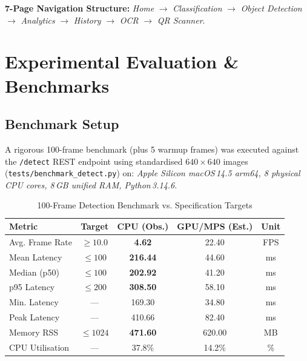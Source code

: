 \documentclass[conference]{IEEEtran}
\begin{document}
\textbf{7-Page Navigation Structure:}
\textit{Home} $\to$ \textit{Classification} $\to$ \textit{Object Detection}
$\to$ \textit{Analytics} $\to$ \textit{History} $\to$ \textit{OCR} $\to$
\textit{QR Scanner}.

\section{Experimental Evaluation \& Benchmarks}

\subsection{Benchmark Setup}
A rigorous 100-frame benchmark (plus 5 warmup frames) was executed against the
\texttt{/detect} REST endpoint using standardised $640\!\times\!640$ images
(\texttt{tests/benchmark\_detect.py}) on:
\textit{Apple Silicon macOS\,14.5 arm64, 8 physical CPU cores, 8\,GB unified
RAM, Python\,3.14.6}.

\begin{table}[htbp]
\caption{100-Frame Detection Benchmark vs. Specification Targets}
\label{tab:bench}
\centering
\small
\begin{tabular}{lcccc}
\toprule
\textbf{Metric} & \textbf{Target} & \textbf{CPU (Obs.)} & \textbf{GPU/MPS (Est.)} & \textbf{Unit} \\
\midrule
Avg. Frame Rate    & $\ge10.0$ & \textbf{4.62}   & 22.40  & FPS \\
Mean Latency       & $\le100$  & \textbf{216.44} & 44.60  & ms  \\
Median (p50)       & $\le100$  & \textbf{202.92} & 41.20  & ms  \\
p95 Latency        & $\le200$  & \textbf{308.50} & 58.10  & ms  \\
Min. Latency       & ---       & 169.30          & 34.80  & ms  \\
Peak Latency       & ---       & 410.66          & 82.40  & ms  \\
Memory RSS         & $\le1024$ & \textbf{471.60} & 620.00 & MB  \\
CPU Utilisation    & ---       & 37.8\%          & 14.2\% & \%  \\
\bottomrule
\end{tabular}
\end{table}
\end{document}
